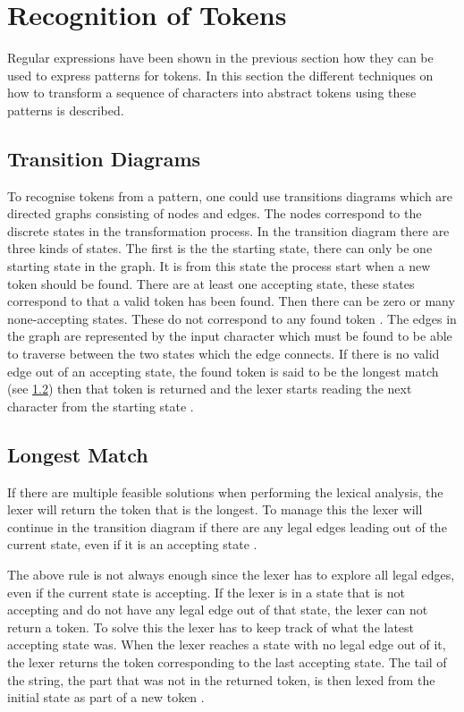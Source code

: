 \section{Recognition of Tokens}
Regular expressions have been shown in the previous section how they can be used
to express patterns for tokens. In this section the different techniques on how
to transform a sequence of characters into abstract tokens using these patterns
is described.

\subsection{Transition Diagrams}
To recognise tokens from a pattern, one could use transitions diagrams which are
directed graphs consisting of nodes and edges. The nodes correspond to the
discrete states in the transformation process. In the transition diagram there
are three kinds of states. The first is the the starting state, there can only
be one starting state in the graph. It is from this state the process start when
a new token should be found. There are at least one accepting state, these states
correspond to that a valid token has been found. Then there can be zero or many
none-accepting states. These do not correspond to any found token \cite{Aho2006}.
The edges in the graph are represented by the input character which must be
found to be able to traverse between the two states which the edge connects. If
there is no valid edge out of an accepting state, the found token is said to be
the longest match (see \cref{sub:longmatch}) then that token is returned and the
lexer starts reading the next character from the starting state \cite{Aho2006}.

\subsection{Longest Match}\label{sub:longmatch}
If there are multiple feasible solutions when performing the lexical
analysis, the lexer will return the token that is the longest. To manage this
the lexer will continue in the transition diagram if there are any legal edges
leading out of the current state, even if it is an accepting state \cite{Aho2006}.

The above rule is not always enough since the lexer has to explore all legal
edges, even if the current state is accepting. If the lexer is in a state that
is not accepting and do not have any legal edge out of that state, the lexer
can not return a token. To solve this the lexer has to keep track of what the
latest accepting state was. When the lexer reaches a state with no
legal edge out of it, the lexer returns the token corresponding to the last
accepting state. The tail of the string, the part that was not in the returned
token, is then lexed from the initial state as part of a new token
\cite{Aho2006}.

